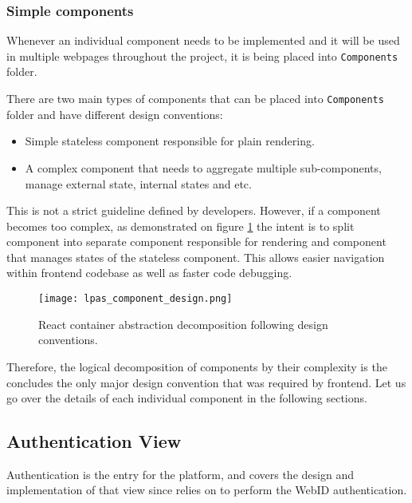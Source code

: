 \subsubsection{Simple components}

Whenever an individual component needs to be implemented and it will be used in multiple webpages throughout the project, it is being placed into \texttt{Components} folder.

There are two main types of components that can be placed into \texttt{Components} folder and have different design conventions:
\begin{itemize}
	\item Simple stateless component responsible for plain rendering.
	\item A complex component that needs to aggregate multiple sub-components, manage external state, internal states and etc.
\end{itemize}


This is not a strict guideline defined by \lpa{} developers. However, if a component becomes too complex, as demonstrated on figure \ref{fig:lpas_component_design} the intent is to split component into separate component responsible for rendering and component that manages states of the stateless component. This allows easier navigation within frontend codebase as well as faster code debugging. 

\begin{figure}[h]
\centering
\texttt{[image: lpas\_component\_design.png]}
\caption{React container abstraction decomposition following \lpas{} design conventions.}
\label{fig:lpas_component_design}
\end{figure}

Therefore, the logical decomposition of components by their complexity is the concludes the only major design convention that was required by \lpa{} frontend. Let us go over the details of each individual component in the following sections.

\subsection{Authentication View}

Authentication is the entry for the \lpa{} platform, and \lpas{} covers the design and implementation of that view since \lpa{} relies on \solid{} to perform the WebID authentication. 

